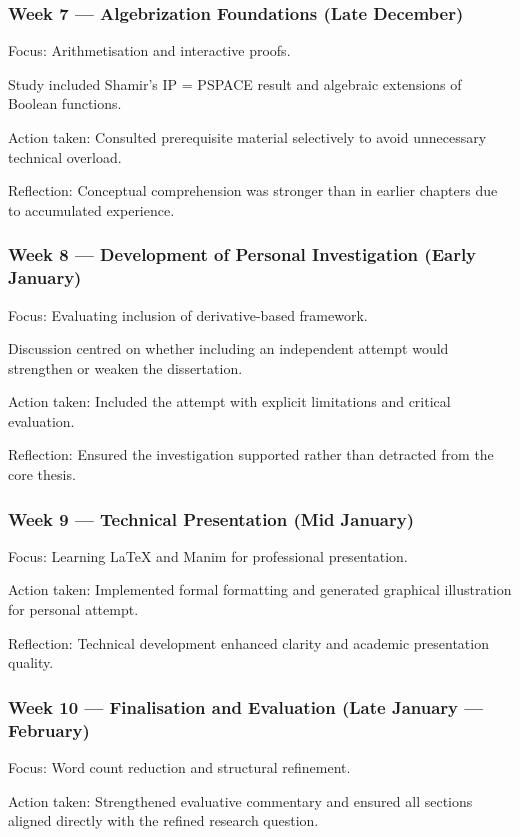 \documentclass[12pt]{article}
\begin{document}
\subsubsection*{Week 7 --- Algebrization Foundations (Late December)}

Focus: Arithmetisation and interactive proofs.

Study included Shamir's IP = PSPACE result and algebraic extensions of Boolean functions.

Action taken: Consulted prerequisite material selectively to avoid unnecessary technical overload.

Reflection: Conceptual comprehension was stronger than in earlier chapters due to accumulated experience.

\subsubsection*{Week 8 --- Development of Personal Investigation (Early January)}

Focus: Evaluating inclusion of derivative-based framework.

Discussion centred on whether including an independent attempt would strengthen or weaken the dissertation.

Action taken: Included the attempt with explicit limitations and critical evaluation.

Reflection: Ensured the investigation supported rather than detracted from the core thesis.

\subsubsection*{Week 9 --- Technical Presentation (Mid January)}

Focus: Learning \LaTeX{} and Manim for professional presentation.

Action taken: Implemented formal formatting and generated graphical illustration for personal attempt.

Reflection: Technical development enhanced clarity and academic presentation quality.

\subsubsection*{Week 10 --- Finalisation and Evaluation (Late January --- February)}

Focus: Word count reduction and structural refinement.

Action taken: Strengthened evaluative commentary and ensured all sections aligned directly with the refined research question.
\end{document}
